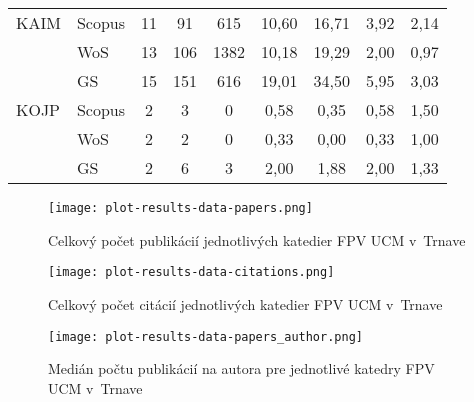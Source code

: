 \begin{table}
\begin{tabular}{llccccccc}
 KAIM & Scopus & 11 & 91   & 615   & 10,60         & 16,71 & 3,92  & 2,14 \\
      & WoS    & 13 & 106  & 1382  & 10,18         & 19,29 & 2,00  & 0,97 \\
      & GS     & 15 & 151  & 616   & 19,01         & 34,50 & 5,95  & 3,03 \\[1ex]
 KOJP & Scopus & 2  & 3    & 0     & 0,58          & 0,35  & 0,58  & 1,50 \\
      & WoS    & 2  & 2    & 0     & 0,33          & 0,00  & 0,33  & 1,00 \\
      & GS     & 2  & 6    & 3     & 2,00          & 1,88  & 2,00  & 1,33 \\
  \bottomrule
\end{tabular}
\end{table}

\begin{figure}
  \centering
  \texttt{[image: plot-results-data-papers.png]}
  \caption{Celkový počet publikácií jednotlivých katedier FPV UCM v~Trnave}
  \label{fig:publications.plot}
\end{figure}

\begin{figure}
  \centering
  \texttt{[image: plot-results-data-citations.png]}
  \caption{Celkový počet citácií jednotlivých katedier FPV UCM v~Trnave}
  \label{fig:citations.plot}
\end{figure}

\begin{figure}
  \centering
  \texttt{[image: plot-results-data-papers\_author.png]}
  \caption{Medián počtu publikácií na autora pre jednotlivé katedry FPV UCM v~Trnave}
  \label{fig:p/a.plot}
\end{figure}


